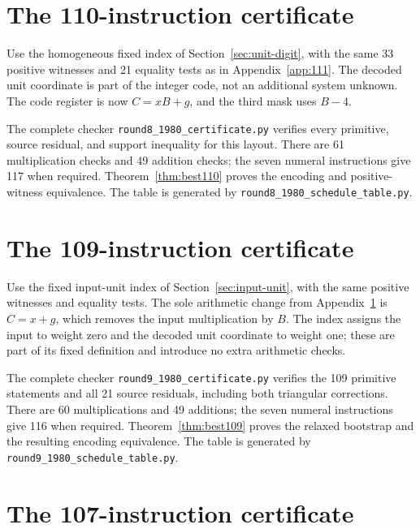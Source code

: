 \documentclass[11pt,letterpaper]{article}
\theoremstyle{definition}
\theoremstyle{remark}
\numberwithin{equation}{section}
\newcommand{\file}[1]{\texttt{#1}}
\begin{document}
\small


\clearpage
\normalsize
\section{The 110-instruction certificate}\label{app:110}

Use the homogeneous fixed index of Section~\ref{sec:unit-digit}, with
the same 33 positive witnesses and 21 equality tests as in
Appendix~\ref{app:111}. The decoded unit coordinate is part of the
integer code, not an additional system unknown. The code register is
now $C=xB+g$, and the third mask uses $B-4$.

The complete checker \file{round8\_1980\_certificate.py} verifies every
primitive, source residual, and support inequality for this layout.
There are 61 multiplication checks and 49 addition checks; the seven
numeral instructions give 117 when required. Theorem~\ref{thm:best110}
proves the encoding and positive-witness equivalence. The table is
generated by \file{round8\_1980\_schedule\_table.py}.

\small


\clearpage
\normalsize
\section{The 109-instruction certificate}\label{app:109}

Use the fixed input-unit index of Section~\ref{sec:input-unit}, with
the same positive witnesses and equality tests. The sole arithmetic
change from Appendix~\ref{app:110} is $C=x+g$, which removes the input
multiplication by $B$. The index assigns the input to weight zero and
the decoded unit coordinate to weight one; these are part of its fixed
definition and introduce no extra arithmetic checks.

The complete checker \file{round9\_1980\_certificate.py} verifies the
109 primitive statements and all 21 source residuals, including both
triangular corrections. There are 60 multiplications and 49 additions;
the seven numeral instructions give 116 when required.
Theorem~\ref{thm:best109} proves the relaxed bootstrap and the resulting
encoding equivalence. The table is generated by
\file{round9\_1980\_schedule\_table.py}.

\small


\clearpage
\normalsize
\section{The 107-instruction certificate}\label{app:107}
\end{document}
